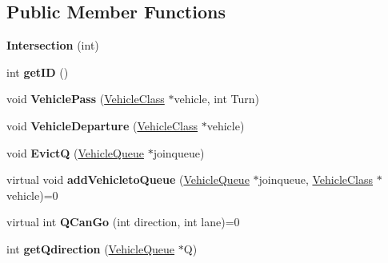 \subsection*{Public Member Functions}
\begin{DoxyCompactItemize}
\item 
\hypertarget{class_intersection_a6f0781ff95de3ebe87e0ca83a9594cbc}{{\bfseries Intersection} (int)}\label{class_intersection_a6f0781ff95de3ebe87e0ca83a9594cbc}

\item 
\hypertarget{class_intersection_af9ffdb4a85d4b9250cc74936068f8d2d}{int {\bfseries get\-I\-D} ()}\label{class_intersection_af9ffdb4a85d4b9250cc74936068f8d2d}

\item 
\hypertarget{class_intersection_afe2e42381c4cf467fca7d2217d92524c}{void {\bfseries Vehicle\-Pass} (\hyperlink{class_vehicle_class}{Vehicle\-Class} $\ast$vehicle, int Turn)}\label{class_intersection_afe2e42381c4cf467fca7d2217d92524c}

\item 
\hypertarget{class_intersection_a358151a5ef4dd58dd42a6444c7e9bfc9}{void {\bfseries Vehicle\-Departure} (\hyperlink{class_vehicle_class}{Vehicle\-Class} $\ast$vehicle)}\label{class_intersection_a358151a5ef4dd58dd42a6444c7e9bfc9}

\item 
\hypertarget{class_intersection_ab6a6b34e31effdf156c39dabf523e5e8}{void {\bfseries Evict\-Q} (\hyperlink{class_vehicle_queue}{Vehicle\-Queue} $\ast$joinqueue)}\label{class_intersection_ab6a6b34e31effdf156c39dabf523e5e8}

\item 
\hypertarget{class_intersection_a6e55e3add20e9d49e5751ccf47832c12}{virtual void {\bfseries add\-Vehicleto\-Queue} (\hyperlink{class_vehicle_queue}{Vehicle\-Queue} $\ast$joinqueue, \hyperlink{class_vehicle_class}{Vehicle\-Class} $\ast$vehicle)=0}\label{class_intersection_a6e55e3add20e9d49e5751ccf47832c12}

\item 
\hypertarget{class_intersection_ade54ec591355782db542061623096a2f}{virtual int {\bfseries Q\-Can\-Go} (int direction, int lane)=0}\label{class_intersection_ade54ec591355782db542061623096a2f}

\item 
\hypertarget{class_intersection_a5cd40e634a34880503bd314124f77e25}{int {\bfseries get\-Qdirection} (\hyperlink{class_vehicle_queue}{Vehicle\-Queue} $\ast$Q)}\label{class_intersection_a5cd40e634a34880503bd314124f77e25}


\end{DoxyCompactItemize}
